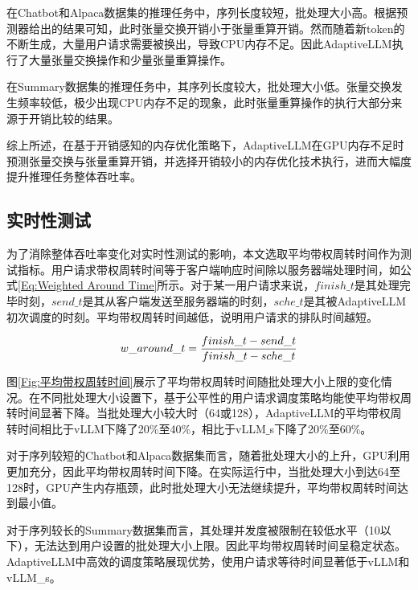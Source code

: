 在Chatbot和Alpaca数据集的推理任务中，序列长度较短，批处理大小高。根据预测器给出的结果可知，此时张量交换开销小于张量重算开销。然而随着新token的不断生成，大量用户请求需要被换出，导致CPU内存不足。因此AdaptiveLLM执行了大量张量交换操作和少量张量重算操作。

在Summary数据集的推理任务中，其序列长度较大，批处理大小低。张量交换发生频率较低，极少出现CPU内存不足的现象，此时张量重算操作的执行大部分来源于开销比较的结果。

综上所述，在基于开销感知的内存优化策略下，AdaptiveLLM在GPU内存不足时预测张量交换与张量重算开销，并选择开销较小的内存优化技术执行，进而大幅度提升推理任务整体吞吐率。 

\subsection{实时性测试}

为了消除整体吞吐率变化对实时性测试的影响，本文选取平均带权周转时间作为测试指标。用户请求带权周转时间等于客户端响应时间除以服务器端处理时间，如公式\ref{Eq:Weighted Around Time}所示。对于某一用户请求来说，$finish\_t$是其处理完毕时刻，$send\_t$是其从客户端发送至服务器端的时刻，$sche\_t$是其被AdaptiveLLM初次调度的时刻。平均带权周转时间越低，说明用户请求的排队时间越短。 

\begin{equation}
  \begin{aligned}
    w\_around\_t = \frac{finish\_t - send\_t}{finish\_t - sche\_t}
  \end{aligned}
  \label{Eq:Weighted Around Time}
  \setlength{\abovedisplayskip}{0ex}
  \setlength{\belowdisplayskip}{2ex}
\end{equation}


图\ref{Fig:平均带权周转时间}展示了平均带权周转时间随批处理大小上限的变化情况。在不同批处理大小设置下，基于公平性的用户请求调度策略均能使平均带权周转时间显著下降。当批处理大小较大时（64或128），AdaptiveLLM的平均带权周转时间相比于vLLM下降了20\%至40\%，相比于vLLM$\_$s下降了20\%至60\%。

对于序列较短的Chatbot和Alpaca数据集而言，随着批处理大小的上升，GPU利用更加充分，因此平均带权周转时间下降。在实际运行中，当批处理大小到达64至128时，GPU产生内存瓶颈，此时批处理大小无法继续提升，平均带权周转时间达到最小值。

对于序列较长的Summary数据集而言，其处理并发度被限制在较低水平（10以下），无法达到用户设置的批处理大小上限。因此平均带权周转时间呈稳定状态。AdaptiveLLM中高效的调度策略展现优势，使用户请求等待时间显著低于vLLM和vLLM\_s。

